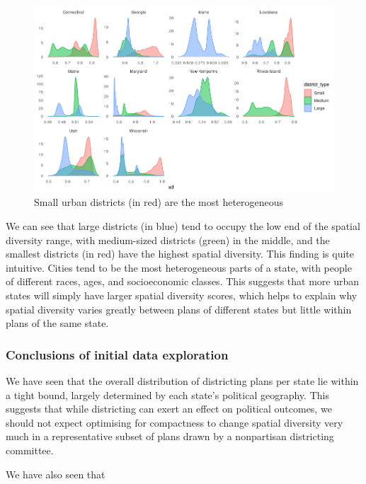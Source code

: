 \documentclass[]{article}
\begin{document}
\begin{figure}
\centering
\includegraphics{../30_results/size_and_sd.png}
\caption{Small urban districts (in red) are the most heterogeneous
\label{pairwise_plot}}
\end{figure}

We can see that large districts (in blue) tend to occupy the low end of
the spatial diversity range, with medium-sized districts (green) in the
middle, and the smallest districts (in red) have the highest spatial
diversity. This finding is quite intuitive. Cities tend to be the most
heterogeneous parts of a state, with people of different races, ages,
and socioeconomic classes. This suggests that more urban states will
simply have larger spatial diversity scores, which helps to explain why
spatial diversity varies greatly between plans of different states but
little within plans of the same state.

\hypertarget{conclusions-of-initial-data-exploration}{%
\subsubsection{Conclusions of initial data
exploration}\label{conclusions-of-initial-data-exploration}}

We have seen that the overall distribution of districting plans per
state lie within a tight bound, largely determined by each state's
political geography. This suggests that while districting can exert an
effect on political outcomes, we should not expect optimising for
compactness to change spatial diversity very much in a representative
subset of plans drawn by a nonpartisan districting committee.

We have also seen that
\end{document}
